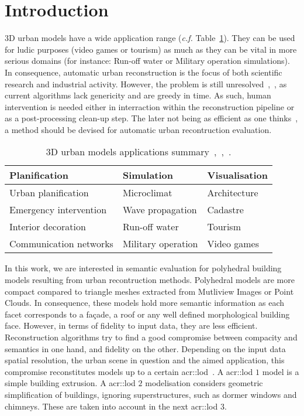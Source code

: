 \documentclass[runningheads]{llncs}
\begin{document}
\section{Introduction}
	3D urban models have a wide application range (\textit{c.f.} Table~\ref{tab::3d_applications}). They can be used for ludic purposes (video games or tourism) as much as they can be vital in more serious domains (for instance: Run-off water or Military operation simulations). In consequence, automatic urban reconstruction is the focus of both scientific research and industrial activity. However, the problem is still unresolved~\cite{Musialski2012},~\cite{rottensteiner2014results}, as current algorithms lack genericity and are greedy in time. As such, human intervention is needed either in interraction within the reconstruction pipeline or as a post-processing clean-up step. The later not being as efficient as one thinks~\cite{Musialski2012}, a method should be devised for automatic urban recontruction evaluation.
	\begin{table}[H]
		\begin{center}
			\begin{tabular}{l l l}
				\toprule
				Planification & Simulation & Visualisation \\
				\midrule
				Urban planification & Microclimat & Architecture \\
				Emergency intervention & Wave propagation & Cadastre \\
				Interior decoration & Run-off water & Tourism \\
				Communication networks & Military operation & Video games \\
				\bottomrule
			\end{tabular}
			\caption{\label{tab::3d_applications} 3D urban models applications summary~\cite{Biljecki2015},~\cite{Scholze2002},~\cite{Wate2015}.}
		\end{center}
	\end{table}
	In this work, we are interested in semantic evaluation for polyhedral building models resulting from urban recontruction methods. Polyhedral models are more compact compared to triangle meshes extracted from Mutliview Images or Point Clouds. In consequence, these models hold more semantic information as each facet corresponds to a fa\c{c}ade, a roof or any well defined morphological building face. However, in terms of fidelity to input data, they are less efficient. Reconstruction algorithms try to find a good compromise between compacity and semantics in one hand, and fidelity on the other. Depending on the input data spatial resolution, the urban scene in question and the aimed application, this compromise reconstitutes models up to a certain \acrfull{acr::lod}~\cite{kolbe2005citygml}. A \acrshort{acr::lod} $1$ model is a simple building extrusion. A \acrshort{acr::lod} $2$ modelisation considers geometric simplification of buildings, ignoring superstructures, such as dormer windows and chimneys. These are taken into account in the next \acrshort{acr::lod} $3$.\\
	
\end{document}
